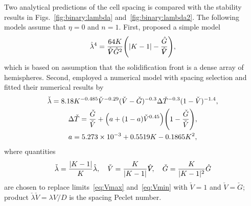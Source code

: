 \documentclass{article}
\newcommand{\hV}[1][\qty(\bar{V})]{\vphantom{#1}\mathrlap{\smash{\hat{V}}}V}
\newcommand{\hG}[1][\qty(\bar{G})]{\vphantom{#1}\smash{\hat{G}}}
\begin{document}
Two analytical predictions of the cell spacing is compared with the stability results
in Figs.~\ref{fig:binary:lambda} and~\ref{fig:binary:lambda2}.
The following models assume that $\eta=0$ and $n=1$.
First, \textcite{hunt1979solidification} proposed a simple model
\begin{equation}\label{eq:Hunt79}
    \hat\lambda^4 = \frac{64K}{\hV \hG^2} \qty(|K-1| - \frac{\hG}{\hV}),
\end{equation}
which is based on assumption that the solidification front is a dense array of hemispheres.
Second, \textcite{hunt1996numerical} employed a numerical model with spacing selection
and fitted their numerical results by
\begin{equation}\label{eq:Hunt96}
    \begin{gathered}
        \check\lambda = 8.18 K^{-0.485}\check{V}^{-0.29}(\check{V} - \check{G})^{-0.3}
            \Delta\check{T}^{-0.3}(1-\check{V})^{-1.4}, \\
        \Delta\check{T} = \frac{\check{G}}{\check{V}}
            + \qty(a + (1-a)\check{V}^{0.45})\qty(1-\frac{\check{G}}{\check{V}}), \\
        a = \num{5.273e-3} + 0.5519K - 0.1865K^2,
    \end{gathered}
\end{equation}
where quantities
\begin{equation}\label{eq:checked}
    \check\lambda = \frac{|K-1|}{K}\hat\lambda, \quad
    \check{V} = \frac{K}{|K-1|}\hV, \quad \check{G} = \frac{K}{|K-1|^2}\hG
\end{equation}
are chosen to replace limits~\eqref{eq:Vmax} and~\eqref{eq:Vmin} with $\check{V}=1$ and $\check{V}=\check{G}$;
product $\check\lambda\check{V} = \lambda V/D$ is the spacing Peclet number.

\printbibliography
\end{document}
